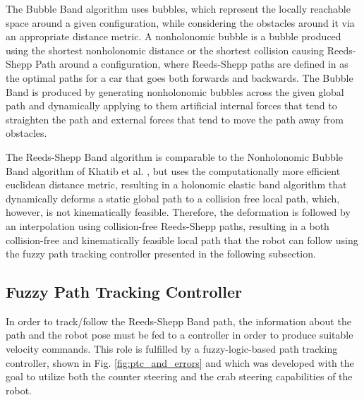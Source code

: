 \documentclass[conference]{IEEEtran}
\begin{document}
The Bubble Band algorithm uses bubbles, which represent the locally reachable space around a given configuration, while considering the obstacles around it via an appropriate distance metric. A nonholonomic bubble is a bubble produced using the shortest nonholonomic distance \cite{rs_metric} or the shortest collision causing Reeds-Shepp Path around a configuration, where Reeds-Shepp paths are defined in \cite{reeds_shepp} as the optimal paths for a car that goes both forwards and backwards. The Bubble Band is produced by generating nonholonomic bubbles across the given global path and dynamically applying to them artificial internal forces that tend to straighten the path and external forces that tend to move the path away from obstacles.

The Reeds-Shepp Band algorithm is comparable to the Nonholonomic Bubble Band algorithm of Khatib et al. \cite{dpm}, but uses the computationally more efficient euclidean distance metric, resulting in a holonomic elastic band \cite{eband} algorithm that dynamically deforms a static global path to a collision free local path, which, however, is not kinematically feasible. Therefore, the deformation is followed by an interpolation using collision-free Reeds-Shepp paths, resulting in a both collision-free and kinematically feasible local path that the robot can follow using the fuzzy path tracking controller presented in the following subsection.

\subsection{Fuzzy Path Tracking Controller}
In order to track/follow the Reeds-Shepp Band path, the information about the path and the robot pose must be fed to a controller in order to produce suitable velocity commands. This role is fulfilled by a fuzzy-logic-based path tracking controller, shown in Fig. \ref{fig:ptc_and_errors} and which was developed with the goal to utilize both the counter steering and the crab steering capabilities of the robot.
\end{document}
